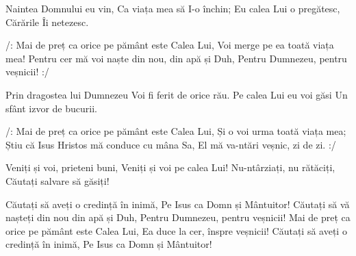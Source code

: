 \beginverse
Naintea Domnului eu vin,
Ca viața mea să I-o închin;
Eu calea Lui o pregătesc,
Cărările Îi netezesc.
\endverse

\beginchorus
/: Mai de preț ca orice pe pământ este Calea Lui,
Voi merge pe ea toată viața mea!
Pentru cer mă voi naște din nou, din apă și Duh,
Pentru Dumnezeu, pentru veșnicii! :/
\endchorus

\beginverse
Prin dragostea lui Dumnezeu
Voi fi ferit de orice rău.
Pe calea Lui eu voi găsi
Un sfânt izvor de bucurii.
\endverse

\beginchorus
/: Mai de preț ca orice pe pământ este Calea Lui,
Și o voi urma toată viața mea;
Știu că Isus Hristos mă conduce cu mâna Sa,
El mă va-ntări veșnic, zi de zi. :/
\endchorus

\beginverse
Veniți și voi, prieteni buni,
Veniți și voi pe calea Lui!
Nu-ntârziați, nu rătăciți,
Căutați salvare să găsiți!
\endverse

\beginchorus
Căutați să aveți o credință în inimă,
Pe Isus ca Domn și Mântuitor!
Căutați să vă nașteți din nou din apă și Duh,
Pentru Dumnezeu, pentru veșnicii!
Mai de preț ca orice pe pământ este Calea Lui,
Ea duce la cer, înspre veșnicii!
Căutați să aveți o credință în inimă,
Pe Isus ca Domn și Mântuitor!
\endchorus
\endsong